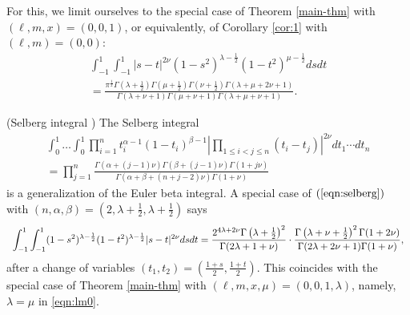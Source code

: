 \documentclass[12pt]{article}
\numberwithin{equation}{section}
\begin{document}
For this, we limit ourselves to the special case of Theorem \ref{main-thm}
with $(\ell, m, x) = (0, 0, 1)$, or equivalently, of Corollary \ref{cor:1}
with $(\ell, m) = (0, 0)$:
\begin{multline}  \label{eqn:lm0}
   \displaystyle\int_{- 1}^1 \displaystyle\int_{- 1}^1 | s - t |^{2 \nu} (1 - s^2)^{\lambda -
  \frac{1}{2}} (1 - t^2)^{\mu - \frac{1}{2}} d s d t \\
  = \frac{\pi^{\frac{1}{2}}
  \Gamma \left( \lambda + \frac{1}{2} \right) \Gamma \left( \mu + \frac{1}{2}
  \right) \Gamma \left( \nu + \frac{1}{2} \right) \Gamma (\lambda + \mu + 2
  \nu + 1)}{\Gamma (\lambda + \nu + 1) \Gamma (\mu + \nu + 1) \Gamma (\lambda
  + \mu + \nu + 1)} .
\end{multline}
\begin{example}
  \label{ex:1}(Selberg integral {\cite{Selberg:411367}}) The Selberg integral
  \begin{eqnarray}
    & \displaystyle\int_0^1 \ldots \displaystyle\int_0^1 \displaystyle\prod_{i = 1}^n t_i^{\alpha - 1} (1 -
    t_i)^{\beta - 1} \left| \displaystyle\prod_{1 \leqslant i < j \leqslant n} (t_i - t_j)
    \right|^{2 \nu} d t_1 \cdots d t_n  \label{eqn:selberg} & \\
    & = \displaystyle\prod_{j = 1}^n \frac{\Gamma (\alpha + (j - 1) \nu) \Gamma (\beta +
    (j - 1) \nu) \Gamma (1 + j \nu)}{\Gamma (\alpha + \beta + (n + j - 2) \nu)
    \Gamma (1 + \nu)} &  \nonumber
  \end{eqnarray}
  is a generalization of the Euler beta integral. A special case of
  $(\ref{eqn:selberg})$ with $(n, \alpha, \beta) = \left( 2, \lambda +
  \frac{1}{2}, \lambda + \frac{1}{2} \right)$ says
  \begin{equation*}
      \begin{array}[]{c}
     \displaystyle\int_{- 1}^1 \displaystyle\int_{- 1}^1 (1 -
    s^2)^{\lambda - \frac{1}{2}} (1 - t^2)^{\lambda - \frac{1}{2}} | s - t
    |^{2 \nu} d s d t 
    = \displaystyle\frac{2^{4\lambda+2\nu}\Gamma \left( \lambda + \frac{1}{2} \right)^2}{\Gamma (2
    \lambda + 1 + \nu)} \cdot \frac{\Gamma \left( \lambda + \nu + \frac{1}{2}
    \right)^2 \Gamma (1 + 2 \nu)}{\Gamma (2 \lambda + 2 \nu + 1) \Gamma (1 +
    \nu)},
      \end{array}
  \end{equation*}
  after a change of variables $(t_1, t_2) = \left( \frac{1 + s}{2}, \frac{1 +
  t}{2} \right)$. This coincides with the special case of Theorem
  \ref{main-thm} with $(\ell,m,x,\mu)=(0,0,1,\lambda)$, namely, $\lambda=\mu$ in 
  \eqref{eqn:lm0}.
\end{example}
\end{document}
